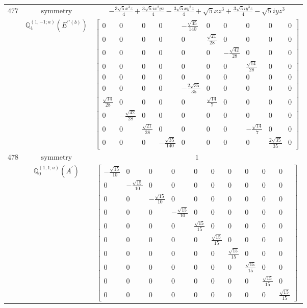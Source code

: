 \documentclass[fleqn,8pt,landscape]{jsarticle}
\begin{document}
\begin{longtable}{ccc}
$ 477 $ & $ \text{symmetry} $ & $ - \frac{3 \sqrt{5} x^{3} z}{4} + \frac{3 \sqrt{5} i x^{2} y z}{4} - \frac{3 \sqrt{5} x y^{2} z}{4} + \sqrt{5} x z^{3} + \frac{3 \sqrt{5} i y^{3} z}{4} - \sqrt{5} i y z^{3} $ \\
$  $ & $ \mathbb{Q}_{4}^{(1,-1;a)}(E^{\prime\prime(b)}) $ & $ \begin{bmatrix} 0 & 0 & 0 & 0 & - \frac{\sqrt{35}}{140} & 0 & 0 & 0 & 0 & 0 \\ 0 & 0 & 0 & 0 & 0 & \frac{\sqrt{21}}{28} & 0 & 0 & 0 & 0 \\ 0 & 0 & 0 & 0 & 0 & 0 & - \frac{\sqrt{42}}{28} & 0 & 0 & 0 \\ 0 & 0 & 0 & 0 & 0 & 0 & 0 & \frac{\sqrt{14}}{28} & 0 & 0 \\ 0 & 0 & 0 & 0 & 0 & 0 & 0 & 0 & 0 & 0 \\ 0 & 0 & 0 & 0 & - \frac{2 \sqrt{35}}{35} & 0 & 0 & 0 & 0 & 0 \\ \frac{\sqrt{14}}{28} & 0 & 0 & 0 & 0 & \frac{\sqrt{14}}{7} & 0 & 0 & 0 & 0 \\ 0 & - \frac{\sqrt{42}}{28} & 0 & 0 & 0 & 0 & 0 & 0 & 0 & 0 \\ 0 & 0 & \frac{\sqrt{21}}{28} & 0 & 0 & 0 & 0 & - \frac{\sqrt{14}}{7} & 0 & 0 \\ 0 & 0 & 0 & - \frac{\sqrt{35}}{140} & 0 & 0 & 0 & 0 & \frac{2 \sqrt{35}}{35} & 0 \end{bmatrix} $ \\ \hline
$ 478 $ & $ \text{symmetry} $ & $ 1 $ \\
$  $ & $ \mathbb{Q}_{0}^{(1,1;a)}(A^{\prime}) $ & $ \begin{bmatrix} - \frac{\sqrt{15}}{10} & 0 & 0 & 0 & 0 & 0 & 0 & 0 & 0 & 0 \\ 0 & - \frac{\sqrt{15}}{10} & 0 & 0 & 0 & 0 & 0 & 0 & 0 & 0 \\ 0 & 0 & - \frac{\sqrt{15}}{10} & 0 & 0 & 0 & 0 & 0 & 0 & 0 \\ 0 & 0 & 0 & - \frac{\sqrt{15}}{10} & 0 & 0 & 0 & 0 & 0 & 0 \\ 0 & 0 & 0 & 0 & \frac{\sqrt{15}}{15} & 0 & 0 & 0 & 0 & 0 \\ 0 & 0 & 0 & 0 & 0 & \frac{\sqrt{15}}{15} & 0 & 0 & 0 & 0 \\ 0 & 0 & 0 & 0 & 0 & 0 & \frac{\sqrt{15}}{15} & 0 & 0 & 0 \\ 0 & 0 & 0 & 0 & 0 & 0 & 0 & \frac{\sqrt{15}}{15} & 0 & 0 \\ 0 & 0 & 0 & 0 & 0 & 0 & 0 & 0 & \frac{\sqrt{15}}{15} & 0 \\ 0 & 0 & 0 & 0 & 0 & 0 & 0 & 0 & 0 & \frac{\sqrt{15}}{15} \end{bmatrix} $ \\ \hline

\end{longtable}
\end{document}
